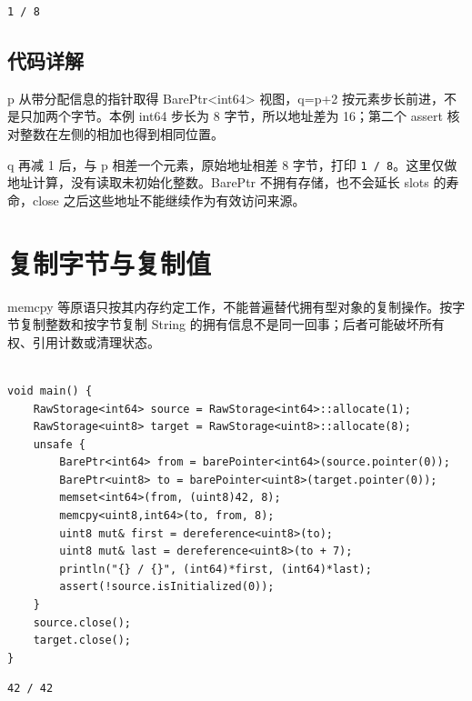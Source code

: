 \par
\medskip
\begin{lstlisting}[style=out]
1 / 8
\end{lstlisting}
\par
\medskip

\subsection*{代码详解}

p 从带分配信息的指针取得 BarePtr<int64> 视图，q=p+2 按元素步长前进，不是只加两个字节。本例 int64 步长为 8 字节，所以地址差为 16；第二个 assert 核对整数在左侧的相加也得到相同位置。

q 再减 1 后，与 p 相差一个元素，原始地址相差 8 字节，打印 \texttt{1 /\allowbreak{} 8}。这里仅做地址计算，没有读取未初始化整数。BarePtr 不拥有存储，也不会延长 slots 的寿命，close 之后这些地址不能继续作为有效访问来源。

\section{复制字节与复制值}

memcpy 等原语只按其内存约定工作，不能普遍替代拥有型对象的复制操作。按字节复制整数和按字节复制 String 的拥有信息不是同一回事；后者可能破坏所有权、引用计数或清理状态。

\par
\medskip
\begin{lstlisting}[style=chali]

void main() {
    RawStorage<int64> source = RawStorage<int64>::allocate(1);
    RawStorage<uint8> target = RawStorage<uint8>::allocate(8);
    unsafe {
        BarePtr<int64> from = barePointer<int64>(source.pointer(0));
        BarePtr<uint8> to = barePointer<uint8>(target.pointer(0));
        memset<int64>(from, (uint8)42, 8);
        memcpy<uint8,int64>(to, from, 8);
        uint8 mut& first = dereference<uint8>(to);
        uint8 mut& last = dereference<uint8>(to + 7);
        println("{} / {}", (int64)*first, (int64)*last);
        assert(!source.isInitialized(0));
    }
    source.close();
    target.close();
}
\end{lstlisting}
\par
\medskip

\par
\medskip
\begin{lstlisting}[style=out]
42 / 42
\end{lstlisting}
\par
\medskip

